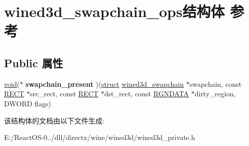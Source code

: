 \hypertarget{structwined3d__swapchain__ops}{}\section{wined3d\+\_\+swapchain\+\_\+ops结构体 参考}
\label{structwined3d__swapchain__ops}
\subsection*{Public 属性}
\begin{DoxyCompactItemize}
\item 
\mbox{\label{structwined3d__swapchain__ops_aad8b8e533ac3bf130764534222ba0db3}} 
\hyperlink{interfacevoid}{void}($\ast$ {\bfseries swapchain\+\_\+present} )(\hyperlink{interfacestruct}{struct} \hyperlink{structwined3d__swapchain}{wined3d\+\_\+swapchain} $\ast$swapchain, const \hyperlink{structtag_r_e_c_t}{R\+E\+CT} $\ast$src\+\_\+rect, const \hyperlink{structtag_r_e_c_t}{R\+E\+CT} $\ast$dst\+\_\+rect, const \hyperlink{struct___r_g_n_d_a_t_a}{R\+G\+N\+D\+A\+TA} $\ast$dirty\+\_\+region, D\+W\+O\+RD flags)
\end{DoxyCompactItemize}


该结构体的文档由以下文件生成\+:\begin{DoxyCompactItemize}
\item 
E\+:/\+React\+O\+S-\/0../dll/directx/wine/wined3d/wined3d\+\_\+private.\+h\end{DoxyCompactItemize}
